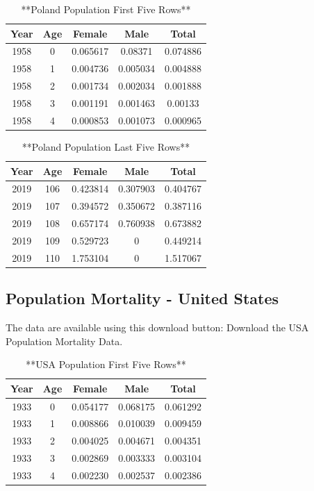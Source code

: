 \documentclass[
]{book}
\begin{document}
\begin{table}

\caption{\label{tab:unnamed-chunk-33}**Poland  Population  First Five Rows**}
\centering
\begin{tabular}[t]{c|c|c|c|c}
\hline
Year & Age & Female & Male & Total\\
\hline
1958 & 0 & 0.065617 & 0.08371 & 0.074886\\
\hline
1958 & 1 & 0.004736 & 0.005034 & 0.004888\\
\hline
1958 & 2 & 0.001734 & 0.002034 & 0.001888\\
\hline
1958 & 3 & 0.001191 & 0.001463 & 0.00133\\
\hline
1958 & 4 & 0.000853 & 0.001073 & 0.000965\\
\hline
\end{tabular}
\end{table}

\begin{table}

\caption{\label{tab:unnamed-chunk-33}**Poland  Population  Last Five Rows**}
\centering
\begin{tabular}[t]{c|c|c|c|c}
\hline
Year & Age & Female & Male & Total\\
\hline
2019 & 106 & 0.423814 & 0.307903 & 0.404767\\
\hline
2019 & 107 & 0.394572 & 0.350672 & 0.387116\\
\hline
2019 & 108 & 0.657174 & 0.760938 & 0.673882\\
\hline
2019 & 109 & 0.529723 & 0 & 0.449214\\
\hline
2019 & 110 & 1.753104 & 0 & 1.517067\\
\hline
\end{tabular}
\end{table}

\hypertarget{population-mortality---united-states}{%
\subsection*{Population Mortality - United States}\label{population-mortality---united-states}}

The data are available using this download button:
Download the USA Population Mortality Data.

\begin{table}

\caption{\label{tab:unnamed-chunk-35}**USA Population  First Five Rows**}
\centering
\begin{tabular}[t]{c|c|c|c|c}
\hline
Year & Age & Female & Male & Total\\
\hline
1933 & 0 & 0.054177 & 0.068175 & 0.061292\\
\hline
1933 & 1 & 0.008866 & 0.010039 & 0.009459\\
\hline
1933 & 2 & 0.004025 & 0.004671 & 0.004351\\
\hline
1933 & 3 & 0.002869 & 0.003333 & 0.003104\\
\hline
1933 & 4 & 0.002230 & 0.002537 & 0.002386\\
\hline
\end{tabular}
\end{table}
\end{document}
